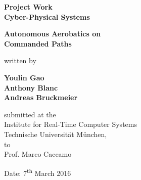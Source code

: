\documentclass[11pt,a4paper]{scrartcl}		%
\begin{document}

\begin{titlepage}
	
	\singlespacing
	\begin{center}
	
		\quad
		\vspace{1cm}
	
		\Large{\textbf{Project Work\\Cyber-Physical Systems}}
	
		\vspace{1.5cm}
	
		\huge{\textbf{Autonomous Aerobatics on\\Commanded Paths}}
	
		\vspace{1.5cm}
	
		written by
		
		\vspace{1.5cm}
	
		\Large{\textbf{Youlin Gao\\Anthony Blanc\\Andreas Bruckmeier}}
	
		\vfill
		
		submitted at the\\
		Institute for Real-Time Computer Systems\\
		Technische Universität München,\\
		to\\
		Prof. Marco Caccamo

		\vspace{1cm}		
		
		Date: 7\textsuperscript{th} March 2016
	
	\end{center}
	
\end{titlepage}



\newpage
\tableofcontents	

\vspace{2.0cm}


\listoffigures
\end{document}
